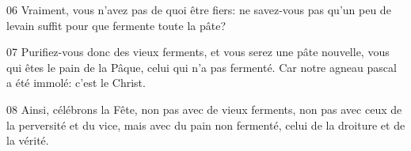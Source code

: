 
06 Vraiment, vous n’avez pas de quoi être fiers: ne savez-vous pas qu’un peu de levain suffit pour que fermente toute la pâte?

07 Purifiez-vous donc des vieux ferments, et vous serez une pâte nouvelle, vous qui êtes le pain de la Pâque, celui qui n’a pas fermenté. Car notre agneau pascal a été immolé: c’est le Christ.

08 Ainsi, célébrons la Fête, non pas avec de vieux ferments, non pas avec ceux de la perversité et du vice, mais avec du pain non fermenté, celui de la droiture et de la vérité.
